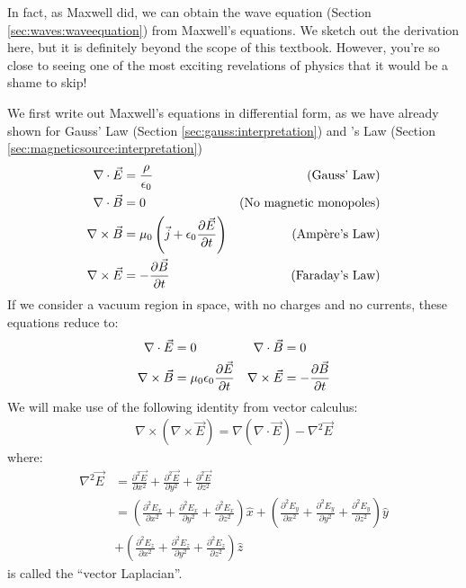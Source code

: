 In fact, as Maxwell did, we can obtain the wave equation (Section \ref{sec:waves:waveequation}) from Maxwell's equations. We sketch out the derivation here, but it is definitely beyond the scope of this textbook. However, you're so close to seeing one of the most exciting revelations of physics that it would be a shame to skip! 

We first write out Maxwell's equations in differential form, as we have already shown for Gauss' Law (Section \ref{sec:gauss:interpretation}) and \ampere's Law (Section \ref{sec:magneticsource:interpretation})
\begin{align*}
 \nabla \cdot \vec E &= \frac{\rho}{\epsilon_0} &\text{(Gauss' Law)}\\
 \nabla \cdot \vec B&= 0 &\text{(No magnetic monopoles)}\\
 \nabla \times \vec B &= \mu_0 \left(\vec j + \epsilon_0\frac{\partial \vec E}{\partial t}\right) &\text{(Amp\`ere's Law)}\\
 \nabla \times \vec E &= -\frac{\partial \vec B}{\partial t} &\text{(Faraday's Law)}\\
\end{align*}
If we consider a vacuum region in space, with no charges and no currents, these equations reduce to:
\begin{align*}
\nabla \cdot \vec E &= 0 &\nabla \cdot \vec B&= 0\\
\nabla \times \vec B &= \mu_0 \epsilon_0\frac{\partial \vec E}{\partial t} & \nabla \times \vec E &= -\frac{\partial \vec B}{\partial t}
\end{align*}
We will make use of the following identity from vector calculus:
\begin{align*}
\nabla \times (\nabla \times \vec E)=\nabla(\nabla\cdot \vec E)-\nabla^2\vec E
\end{align*}
where:
\begin{align*}
\nabla^2\vec E &= \frac{\partial^2 \vec E}{\partial x^2}+\frac{\partial^2 \vec E}{\partial y^2} + \frac{\partial^2 \vec E}{\partial z^2}\\
&=\left(\frac{\partial^2 E_x}{\partial x^2}+\frac{\partial^2  E_x}{\partial y^2} + \frac{\partial^2 E_x}{\partial z^2} \right) \hat x+ \left( \frac{\partial^2 E_y}{\partial x^2}+\frac{\partial^2  E_y}{\partial y^2} + \frac{\partial^2 E_y}{\partial z^2} \right) \hat y \\
&+ \left(\frac{\partial^2 E_z}{\partial x^2}+\frac{\partial^2  E_z}{\partial y^2} + \frac{\partial^2 E_z}{\partial z^2}  \right) \hat z
\end{align*}
is called the ``vector Laplacian''.

